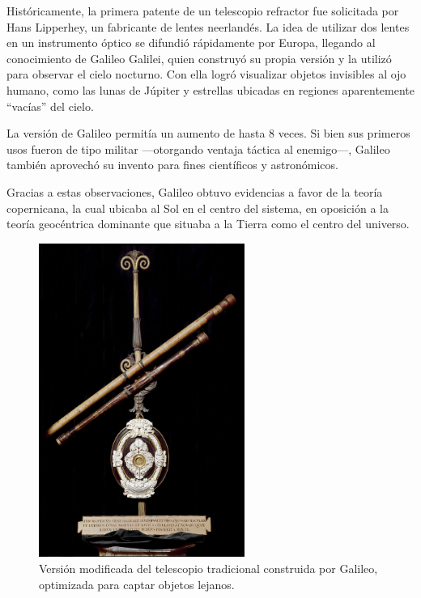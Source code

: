 Históricamente, la primera patente de un telescopio refractor fue solicitada por Hans Lipperhey, un fabricante de lentes neerlandés. La idea de utilizar dos lentes en un instrumento óptico se difundió rápidamente por Europa, llegando al conocimiento de Galileo Galilei, quien construyó su propia versión y la utilizó para observar el cielo nocturno. Con ella logró visualizar objetos invisibles al ojo humano, como las lunas de Júpiter y estrellas ubicadas en regiones aparentemente “vacías” del cielo.

La versión de Galileo permitía un aumento de hasta 8 veces. Si bien sus primeros usos fueron de tipo militar —otorgando ventaja táctica al enemigo—, Galileo también aprovechó su invento para fines científicos y astronómicos.

Gracias a estas observaciones, Galileo obtuvo evidencias a favor de la teoría copernicana, la cual ubicaba al Sol en el centro del sistema, en oposición a la teoría geocéntrica dominante que situaba a la Tierra como el centro del universo.

\begin{figure}[H]
	\centering
	\includegraphics[width=0.6\textwidth]{images/telescopio_galileo.jpg}
	\caption{Versión modificada del telescopio tradicional construida por Galileo, optimizada para captar objetos lejanos.}
	\label{fig:telescopio_patente_galileo}
\end{figure}


